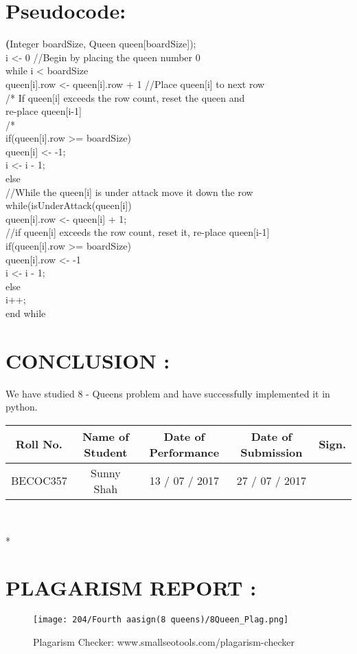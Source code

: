 \documentclass{article}
\begin{document}
	\section{Pseudocode:} 
	\textbf(Integer boardSize, Queen queen[boardSize]);\\
	i <- 0   //Begin by placing the queen number 0\\
	while i < boardSize\\
	queen[i].row <- queen[i].row + 1   //Place queen[i] to next row\\
	/* If queen[i] exceeds the row count, reset the queen and\\
	re-place queen[i-1]\\
	/*\\
	if(queen[i].row >= boardSize)\\
	queen[i] <- -1;\\
	i <- i - 1;\\
	else\\
	//While the queen[i] is under attack move it down the row\\
	while(isUnderAttack(queen[i])\\
	queen[i].row <- queen[i] + 1;\\
	//if queen[i] exceeds the row count, reset it, re-place queen[i-1]\\
	if(queen[i].row >= boardSize)\\
	queen[i].row <- -1\\
	i <- i - 1;\\
	else\\
	i++;\\
	end while\\
	\section{CONCLUSION : }
	
	We have studied 8 - Queens problem  and have successfully implemented it in python.
	
	\begin{center}
		\begin{tabular}
			{|c|c|c|c|c|}\hline
			{\bf Roll No.}		&{\bf Name of Student}	&{\bf Date of Performance}  				&{\bf Date of Submission}	&{\bf Sign.}  \\    \hline
			BECOC357	& Sunny Shah  & 13 / 07 / 2017		& 27 / 07 / 2017	&  \\ \hline
		\end{tabular}\\ 
	\end{center}*
	
	
	\newpage
	\section{PLAGARISM REPORT :}
	\begin{figure}[h!]
		\centering
		\texttt{[image: 204/Fourth aasign(8 queens)/8Queen\_Plag.png]}
		\caption{Plagarism Checker: www.smallseotools.com/plagarism-checker}
	\end{figure}
	\newpage
	
\end{document}
